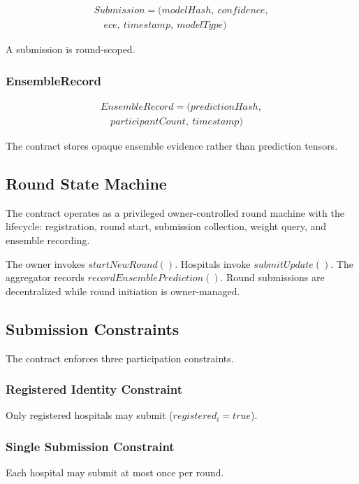 \documentclass[conference]{IEEEtran}
\begin{document}
\begin{multline}
Submission=(modelHash,\ confidence,\\
\quad ece,\ timestamp,\ modelType)
\end{multline}

A submission is round-scoped.

\subsubsection{EnsembleRecord}

\begin{multline}
EnsembleRecord=(predictionHash,\\
\quad participantCount,\ timestamp)
\end{multline}

The contract stores opaque ensemble evidence rather than prediction tensors.

\subsection{Round State Machine}

The contract operates as a privileged owner-controlled round machine with the lifecycle: registration, round start, submission collection, weight query, and ensemble recording.

The owner invokes $startNewRound()$. Hospitals invoke $submitUpdate()$. The aggregator records $recordEnsemblePrediction()$. Round submissions are decentralized while round initiation is owner-managed.

\subsection{Submission Constraints}

The contract enforces three participation constraints.

\subsubsection{Registered Identity Constraint}

Only registered hospitals may submit ($registered_i = true$).

\subsubsection{Single Submission Constraint}

Each hospital may submit at most once per round.
\end{document}
